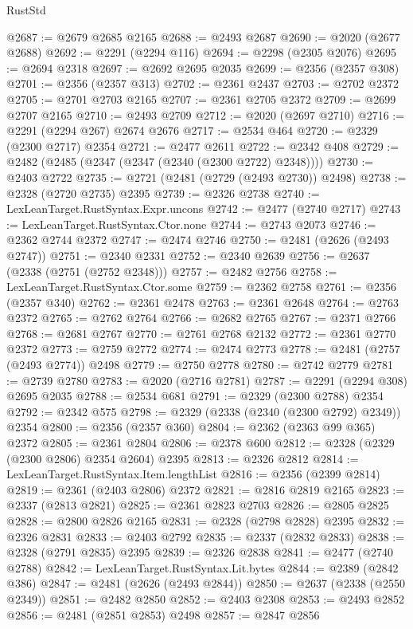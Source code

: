 \begin{lexlean}{RustStd}
\begin{coremodule}
@2687 := @2679 @2685 @2165
@2688 := @2493 @2687
@2690 := @2020 (@2677 @2688)
@2692 := @2291 (@2294 @116)
@2694 := @2298 (@2305 @2076)
@2695 := @2694 @2318
@2697 := @2692 @2695 @2035
@2699 := @2356 (@2357 @308)
@2701 := @2356 (@2357 @313)
@2702 := @2361 @2437
@2703 := @2702 @2372
@2705 := @2701 @2703 @2165
@2707 := @2361 @2705 @2372
@2709 := @2699 @2707 @2165
@2710 := @2493 @2709
@2712 := @2020 (@2697 @2710)
@2716 := @2291 (@2294 @267) @2674 @2676
@2717 := @2534 @464
@2720 := @2329 (@2300 @2717) @2354
@2721 := @2477 @2611
@2722 := @2342 @408
@2729 := @2482 (@2485 (@2347 (@2347 (@2340 (@2300 @2722) @2348))))
@2730 := @2403 @2722
@2735 := @2721 (@2481 (@2729 (@2493 @2730)) @2498)
@2738 := @2328 (@2720 @2735) @2395
@2739 := @2326 @2738
@2740 := LexLeanTarget.RustSyntax.Expr.uncons
@2742 := @2477 (@2740 @2717)
@2743 := LexLeanTarget.RustSyntax.Ctor.none
@2744 := @2743 @2073
@2746 := @2362 @2744 @2372
@2747 := @2474 @2746
@2750 := @2481 (@2626 (@2493 @2747))
@2751 := @2340 @2331
@2752 := @2340 @2639
@2756 := @2637 (@2338 (@2751 (@2752 @2348)))
@2757 := @2482 @2756
@2758 := LexLeanTarget.RustSyntax.Ctor.some
@2759 := @2362 @2758
@2761 := @2356 (@2357 @340)
@2762 := @2361 @2478
@2763 := @2361 @2648
@2764 := @2763 @2372
@2765 := @2762 @2764
@2766 := @2682 @2765
@2767 := @2371 @2766
@2768 := @2681 @2767
@2770 := @2761 @2768 @2132
@2772 := @2361 @2770 @2372
@2773 := @2759 @2772
@2774 := @2474 @2773
@2778 := @2481 (@2757 (@2493 @2774)) @2498
@2779 := @2750 @2778
@2780 := @2742 @2779
@2781 := @2739 @2780
@2783 := @2020 (@2716 @2781)
@2787 := @2291 (@2294 @308) @2695 @2035
@2788 := @2534 @681
@2791 := @2329 (@2300 @2788) @2354
@2792 := @2342 @575
@2798 := @2329 (@2338 (@2340 (@2300 @2792) @2349)) @2354
@2800 := @2356 (@2357 @360)
@2804 := @2362 (@2363 @99 @365) @2372
@2805 := @2361 @2804
@2806 := @2378 @600
@2812 := @2328 (@2329 (@2300 @2806) @2354 @2604) @2395
@2813 := @2326 @2812
@2814 := LexLeanTarget.RustSyntax.Item.lengthList
@2816 := @2356 (@2399 @2814)
@2819 := @2361 (@2403 @2806) @2372
@2821 := @2816 @2819 @2165
@2823 := @2337 (@2813 @2821)
@2825 := @2361 @2823 @2703
@2826 := @2805 @2825
@2828 := @2800 @2826 @2165
@2831 := @2328 (@2798 @2828) @2395
@2832 := @2326 @2831
@2833 := @2403 @2792
@2835 := @2337 (@2832 @2833)
@2838 := @2328 (@2791 @2835) @2395
@2839 := @2326 @2838
@2841 := @2477 (@2740 @2788)
@2842 := LexLeanTarget.RustSyntax.Lit.bytes
@2844 := @2389 (@2842 @386)
@2847 := @2481 (@2626 (@2493 @2844))
@2850 := @2637 (@2338 (@2550 @2349))
@2851 := @2482 @2850
@2852 := @2403 @2308
@2853 := @2493 @2852
@2856 := @2481 (@2851 @2853) @2498
@2857 := @2847 @2856

\end{coremodule}
\end{lexlean}
